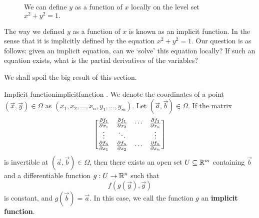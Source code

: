 \begin{figure}[h]
    \centering
    \caption{We can define $y$ as a function of $x$ locally on the level set $x^2+y^2=1.$}
\end{figure}
The way we defined $y$ as a function of $x$ is known as an implicit function. In the sense that it is implicitly defined by the equation $x^2+y^2=1$.
Our question is as follows: given an implicit equation, can we `solve' this equation locally? If such an equation exists, what is the partial derivatives of the variables?

We shall spoil the big result of this section. 
\begin{atheorem}{Implicit function}{implicitfunction}
    . We denote the coordinates of a point $(\vec{x},\vec{y})\in \Omega$ as $(x_1,x_2,\ldots, x_n,y_1,\ldots,y_m)$. Let $(\vec{a},\vec{b})\in \Omega$. If the matrix \[
    \begin{bmatrix}
        \pdv{f_1}{x_1} & \pdv{f_1}{x_2} & \cdots & \pdv{f_1}{x_n}\\
        \vdots &\ddots&& \vdots \\
         \pdv{f_n}{x_1}& \pdv{f_n}{x_2} &\cdots & \pdv{f_n}{x_n}
    \end{bmatrix}
    \] is invertible at $(\vec{a},\vec{b})\in \Omega$, then there exists an open set $U\subseteq \mathbb{R}^m$ containing $\vec{b}$ and a differentiable function $g:U\to \mathbb{R}^n$ such that \[
    f(g(\vec{y}),\vec{y})
    \]
    is constant, and $g(\vec{b})=\vec{a}$. In this case, we call the function $g$ an \textbf{implicit function}.
\end{atheorem}


